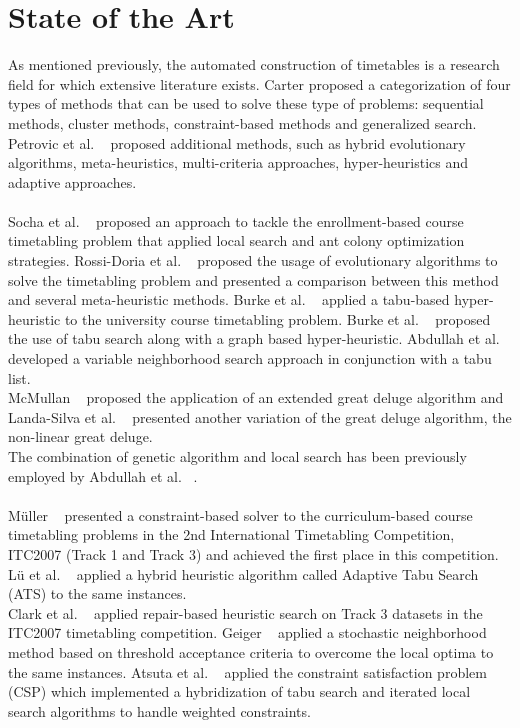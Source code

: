 \chapter{State of the Art}
\label{overview}
\thispagestyle{plain}
As mentioned previously, the automated construction of timetables is a research field for which extensive literature exists. Carter \cite{Carter1986} proposed a categorization of four types of methods that can be used to solve these type of problems: sequential methods, cluster methods, constraint-based methods and generalized search. Petrovic et al. ~\cite{Petrovic2004} proposed additional methods, such as hybrid evolutionary algorithms, meta-heuristics, multi-criteria approaches, hyper-heuristics and adaptive approaches.\\
\\
Socha et al. ~\cite{Socha2002} proposed an approach to tackle the enrollment-based course timetabling problem that applied local search and ant colony optimization strategies. Rossi-Doria et al. ~\cite{Rossi-Doria2003} proposed the usage of evolutionary algorithms to solve the timetabling problem and presented a comparison between this method and several meta-heuristic methods.
Burke et al. ~\cite{Burke2003} applied a tabu-based hyper-heuristic to the university course timetabling problem. Burke et al. ~\cite{Burke2007} proposed the use of tabu search along with a graph based hyper-heuristic. Abdullah et al. ~\cite{Abdullah2005} developed a variable neighborhood search approach in conjunction with a tabu list.\\
McMullan ~\cite{McMullan2007} proposed the application of an extended great deluge algorithm and Landa-Silva et al. ~\cite{Landa-Silva2008} presented another variation of the great deluge algorithm, the non-linear great deluge.\\
The combination of genetic algorithm and local search has been previously employed by Abdullah et al. ~\cite{Abdullah2008}.\\
\\
Müller ~\cite{Mueller2007} presented a constraint-based solver to the curriculum-based course timetabling problems in the 2nd International Timetabling Competition, ITC2007 (Track 1 and Track 3) and achieved the first place in this competition. Lü et al. ~\cite{Lue2010} applied a hybrid heuristic algorithm called Adaptive Tabu Search (ATS) to the same instances.\\
Clark et al. ~\cite{Clark2008} applied repair-based heuristic search on Track 3 datasets in the ITC2007 timetabling competition. Geiger ~\cite{Geiger2008} applied a stochastic neighborhood method based on threshold acceptance criteria to overcome the local optima to the same instances. Atsuta et al. ~\cite{Atsuta2007} applied the constraint satisfaction problem (CSP) which implemented a hybridization of tabu search and iterated local search algorithms to handle weighted constraints.\\
